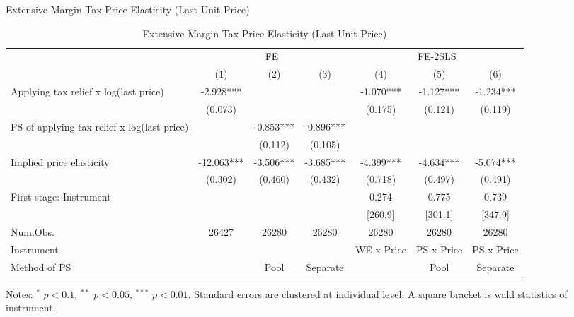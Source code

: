 \documentclass[
  ignorenonframetext,
  aspectratio=169,
]{beamer}
\begin{document}
\begin{frame}{Extensive-Margin Tax-Price Elasticity (Last-Unit Price)}
\protect\hypertarget{extensive-margin-tax-price-elasticity-last-unit-price}{}
\begin{table}

\caption{\label{tab:LastExtensive}Extensive-Margin Tax-Price Elasticity (Last-Unit Price)}
\centering
\fontsize{7}{9}\selectfont
\begin{threeparttable}
\begin{tabular}[t]{lcccccc}
\toprule
\multicolumn{1}{c}{ } & \multicolumn{3}{c}{FE} & \multicolumn{3}{c}{FE-2SLS} \\
\cmidrule(l{3pt}r{3pt}){2-4} \cmidrule(l{3pt}r{3pt}){5-7}
  & (1) & (2) & (3) & (4) & (5) & (6)\\
\midrule
Applying tax relief x log(last price) & -2.928*** &  &  & -1.070*** & -1.127*** & -1.234***\\
 & (0.073) &  &  & (0.175) & (0.121) & (0.119)\\
PS of applying tax relief x log(last price) &  & -0.853*** & -0.896*** &  &  & \\
 &  & (0.112) & (0.105) &  &  & \\
\midrule
Implied price elasticity & -12.063*** & -3.506*** & -3.685*** & -4.399*** & -4.634*** & -5.074***\\
 & (0.302) & (0.460) & (0.432) & (0.718) & (0.497) & (0.491)\\
First-stage: Instrument &  &  &  & 0.274 & 0.775 & 0.739\\
 &  &  &  & [260.9] & [301.1] & [347.9]\\
Num.Obs. & 26427 & 26280 & 26280 & 26280 & 26280 & 26280\\
Instrument &  &  &  & WE x Price & PS x Price & PS x Price\\
Method of PS &  & Pool & Separate &  & Pool & Separate\\
\bottomrule
\end{tabular}
\begin{tablenotes}
\item Notes: $^{*}$ $p < 0.1$, $^{**}$ $p < 0.05$, $^{***}$ $p < 0.01$. Standard errors are clustered at individual level. A square bracket is wald statistics of instrument.
\end{tablenotes}
\end{threeparttable}
\end{table}
\end{frame}
\end{document}
